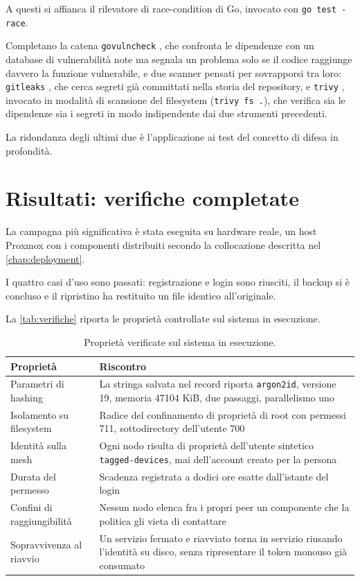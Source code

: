 A questi si affianca il rilevatore di race-condition di Go, invocato con \texttt{go test -race}.

Completano la catena \texttt{govulncheck} \cite{govulncheck}, che confronta le dipendenze con un database
di vulnerabilità note ma segnala un problema solo se il codice raggiunge davvero la funzione vulnerabile,
e due scanner pensati per sovrapporsi tra loro:
\texttt{gitleaks} \cite{gitleaks}, che cerca segreti già committati nella storia del repository, e
\texttt{trivy} \cite{trivy}, invocato in modalità di scansione del filesystem (\texttt{trivy fs .}), che
verifica sia le dipendenze sia i segreti in modo indipendente dai due strumenti precedenti.

La ridondanza degli ultimi due è l'applicazione ai test del concetto di difesa in profondità.

\section{Risultati: verifiche completate}

La campagna più significativa è stata eseguita su hardware reale, un host Proxmox con i componenti
distribuiti secondo la collocazione descritta nel \autoref{chap:deployment}. 

I quattro casi d'uso sono passati: registrazione e login sono riusciti, il backup si è concluso e il
ripristino ha restituito un file identico all'originale. 

La \autoref{tab:verifiche} riporta le proprietà controllate sul sistema in esecuzione.

\begin{table}[H]
\centering
\caption{Proprietà verificate sul sistema in esecuzione.}
\label{tab:verifiche}
\begin{tabular}{@{}p{} p{}@{}}
\hline
\textbf{Proprietà} & \textbf{Riscontro} \\
\hline
Parametri di hashing & La stringa salvata nel record riporta \texttt{argon2id}, versione 19,
memoria 47104 KiB, due passaggi, parallelismo uno \\
Isolamento su filesystem & Radice del confinamento di proprietà di root con permessi 711,
sottodirectory dell'utente 700 \\
Identità sulla mesh & Ogni nodo risulta di proprietà dell'utente sintetico
\texttt{tagged-devices}, mai dell'account creato per la persona \\
Durata del permesso & Scadenza registrata a dodici ore esatte dall'istante del login \\
Confini di raggiungibilità & Nessun nodo elenca fra i propri peer un componente che la
politica gli vieta di contattare \\
Sopravvivenza al riavvio & Un servizio fermato e riavviato torna in servizio riusando
l'identità su disco, senza ripresentare il token monouso già consumato \\
\hline
\end{tabular}
\end{table}

